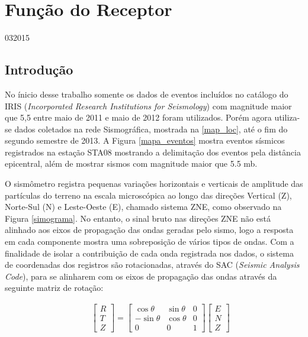 \chapter{Função do Receptor}
\date{24}{03}{2015}


\section{Introdução}

No ínicio desse trabalho somente os dados de eventos incluídos no catálogo do IRIS (\textit{Incorporated Research Institutions for Seismology}) com magnitude maior que 5,5 entre maio de 2011 e maio de 2012 foram utilizados. Porém agora utiliza-se dados coletados na rede Sismográfica, mostrada na \ref{map_loc}, até o fim do segundo semestre de 2013. A Figura \ref{mapa_eventos} mostra eventos sísmicos registrados na estação STA08 mostrando a delimitação dos eventos pela distância epicentral, além de mostrar sismos com magnitude maior que 5.5 mb.

O sismômetro registra pequenas variações horizontais e verticais de amplitude das partículas do terreno na escala microscópica ao longo das direções Vertical (Z), Norte-Sul (N) e Leste-Oeste (E), chamado sistema ZNE, como observado na Figura \ref{simograma}. No entanto, o sinal bruto nas direções ZNE não está alinhado aos eixos de propagação das ondas geradas pelo sismo, logo a resposta em cada componente mostra uma sobreposição de vários tipos de ondas. Com a finalidade de isolar a contribuição de cada onda registrada nos dados, o sistema de coordenadas dos registros são rotacionadas, através do SAC (\textit{Seismic Analysis Code}), para se alinharem com os eixos de propagação das ondas através da seguinte matriz de rotação:

\begin{eqnarray}
 & & \left[ \begin{array}{c} R \\ T \\ Z \end{array} \right] = \begin{bmatrix} \cos \theta & \sin \theta & 0 \\ - \sin \theta & \cos \theta & 0 \\ 0 & 0 & 1 \end{bmatrix} \left[ \begin{array}{c} E \\ N \\ Z \end{array} \right]
\label{rotacao}
\end{eqnarray}

